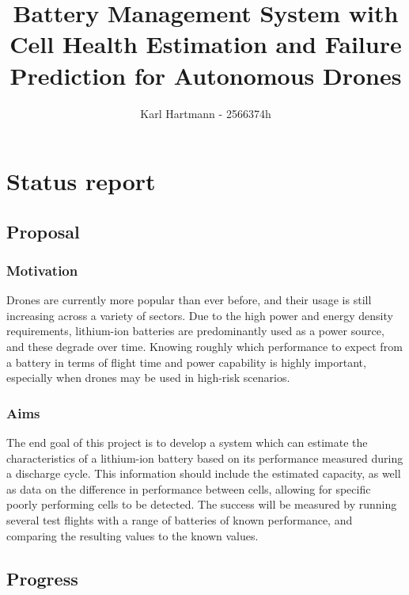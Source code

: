 \documentclass[11pt]{article}
\title{ {{Battery Management System with Cell Health Estimation and Failure Prediction for Autonomous Drones}} }
\author{ {{Karl Hartmann}} - {{2566374h}} }
\begin{document}
    \maketitle
    
    
     

\section{Status report}

\subsection{Proposal}\label{proposal}

\subsubsection{Motivation}\label{motivation}

Drones are currently more popular than ever before, and their usage is still increasing across a variety of sectors. Due to the high power and energy density requirements, lithium-ion batteries are predominantly used as a power source, and these degrade over time. Knowing roughly which performance to expect from a battery in terms of flight time and power capability is highly important, especially when drones may be used in high-risk scenarios.

\subsubsection{Aims}\label{aims}

The end goal of this project is to develop a system which can estimate the characteristics of a lithium-ion battery based on its performance measured during a discharge cycle. This information should include the estimated capacity, as well as data on the difference in performance between cells, allowing for specific poorly performing cells to be detected. The success will be measured by running several test flights with a range of batteries of known performance, and comparing the resulting values to the known values.

\subsection{Progress}\label{progress}
\end{document}
